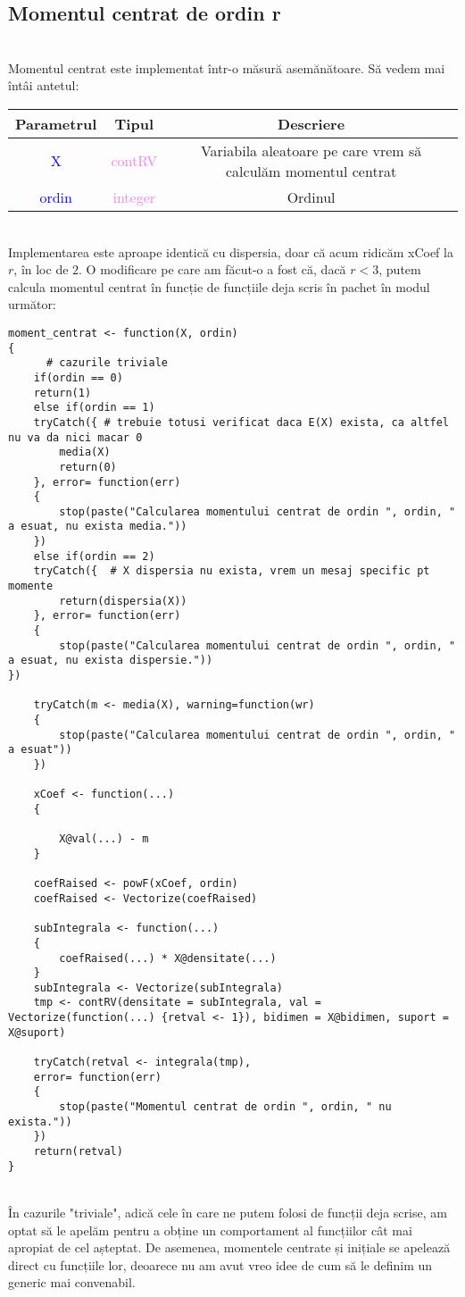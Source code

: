 \documentclass[12pt]{article}
\begin{document}
\subsection{Momentul centrat de ordin r}\hfill \\
\indent Momentul centrat este implementat într-o măsură asemănătoare. Să vedem mai întâi antetul:
\begin{center}
	\begin{tabular}{|| c | c | c ||}
		\hline
		Parametrul & Tipul & Descriere \\
		\hline
		\textcolor{blue}{X} & \textcolor{violet}{contRV} & Variabila aleatoare pe care vrem să calculăm momentul centrat\\
		\hline
		\textcolor{blue}{ordin} & \textcolor{violet}{integer} & Ordinul\\
		\hline
	\end{tabular}
\end{center}\hfill \\
\indent Implementarea este aproape identică cu dispersia, doar că acum ridicăm xCoef la $r$, în loc de $2$. O modificare pe care am făcut-o a fost că, dacă $r < 3$, putem calcula momentul centrat în funcție de funcțiile deja scris în pachet în modul următor:
\begin{lstlisting}
moment_centrat <- function(X, ordin)
{
	  # cazurile triviale
	if(ordin == 0)
	return(1)
	else if(ordin == 1)
	tryCatch({ # trebuie totusi verificat daca E(X) exista, ca altfel nu va da nici macar 0
		media(X)
		return(0)
	}, error= function(err)
	{
		stop(paste("Calcularea momentului centrat de ordin ", ordin, " a esuat, nu exista media."))
	})
	else if(ordin == 2)
	tryCatch({  # X dispersia nu exista, vrem un mesaj specific pt momente
		return(dispersia(X))
	}, error= function(err)
	{
		stop(paste("Calcularea momentului centrat de ordin ", ordin, " a esuat, nu exista dispersie."))
})
	
	tryCatch(m <- media(X), warning=function(wr)
	{
		stop(paste("Calcularea momentului centrat de ordin ", ordin, " a esuat"))
	})
	
	xCoef <- function(...)
	{
		
		X@val(...) - m
	}
	
	coefRaised <- powF(xCoef, ordin)
	coefRaised <- Vectorize(coefRaised)
	
	subIntegrala <- function(...)
	{
		coefRaised(...) * X@densitate(...)
	}
	subIntegrala <- Vectorize(subIntegrala)
	tmp <- contRV(densitate = subIntegrala, val = Vectorize(function(...) {retval <- 1}), bidimen = X@bidimen, suport = X@suport)
	
	tryCatch(retval <- integrala(tmp),
	error= function(err)
	{
		stop(paste("Momentul centrat de ordin ", ordin, " nu exista."))
	})
	return(retval)
}
\end{lstlisting} \hfill \\
\indent În cazurile "triviale", adică cele în care ne putem folosi de funcții deja scrise, am optat să le apelăm pentru a obține un comportament al funcțiilor cât mai apropiat de cel așteptat. De asemenea, momentele centrate și inițiale se apelează direct cu funcțiile lor, deoarece nu am avut vreo idee de cum să le definim un generic mai convenabil. \\
\end{document}
